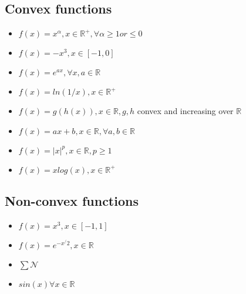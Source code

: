 \subsection{Convex functions}
\begin{itemize}
\item $f(x) = x^{\alpha}, x \in \mathbb{R^+}, \forall \alpha \ge 1 or \le 0$
\item $f(x) = -x^3, x \in [-1,0]$
\item $f(x) = e^{ax}, \forall x,a \in \mathbb{R}$
\item $f(x) = ln(1/x), x \in \mathbb{R^+}$
\item $f(x) = g(h(x)), x \in \mathbb{R}, g,h$ convex and increasing over $\mathbb{R}$
\item $f(x) = ax+b, x \in \mathbb{R}, \forall a,b \in \mathbb{R}$
\item $f(x) = |x|^p, x \in \mathbb{R}, p\ge 1$
\item $f(x) = xlog(x), x \in \mathbb{R}^+$
\end{itemize}

\subsection{Non-convex functions}
\begin{itemize}
\item $f(x) = x^3, x \in [-1,1]$
\item $f(x) = e^{-x^/2}, x \in \mathbb{R}$
\item $\sum \mathcal{N}$
\item $sin(x) \forall x \in \mathbb{R}$
\end{itemize}

